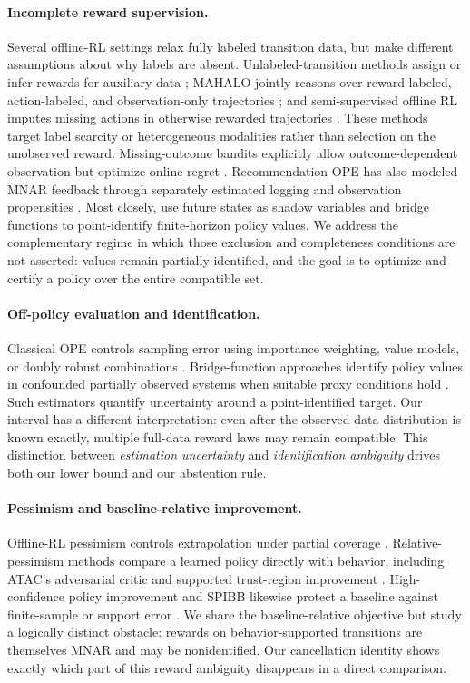 \documentclass[letterpaper]{article}
\theoremstyle{remark}
\begin{document}
\paragraph{Incomplete reward supervision.}
Several offline-RL settings relax fully labeled transition data, but make different assumptions about why labels are absent. Unlabeled-transition methods assign or infer rewards for auxiliary data \citep{yu2022unlabeled}; MAHALO jointly reasons over reward-labeled, action-labeled, and observation-only trajectories \citep{li2023mahalo}; and semi-supervised offline RL imputes missing actions in otherwise rewarded trajectories \citep{zheng2023semi}. These methods target label scarcity or heterogeneous modalities rather than selection on the unobserved reward. Missing-outcome bandits explicitly allow outcome-dependent observation but optimize online regret \citep{mahrooghi2025missing}. Recommendation OPE has also modeled MNAR feedback through separately estimated logging and observation propensities \citep{takahashi2025mnar}. Most closely, \citet{wei2026mnar} use future states as shadow variables and bridge functions to point-identify finite-horizon policy values. We address the complementary regime in which those exclusion and completeness conditions are not asserted: values remain partially identified, and the goal is to optimize and certify a policy over the entire compatible set.

\paragraph{Off-policy evaluation and identification.}
Classical OPE controls sampling error using importance weighting, value models, or doubly robust combinations \citep{jiang2016doubly}. Bridge-function approaches identify policy values in confounded partially observed systems when suitable proxy conditions hold \citep{shi2022confounded}. Such estimators quantify uncertainty around a point-identified target. Our interval has a different interpretation: even after the observed-data distribution is known exactly, multiple full-data reward laws may remain compatible. This distinction between \emph{estimation uncertainty} and \emph{identification ambiguity} drives both our lower bound and our abstention rule.

\paragraph{Pessimism and baseline-relative improvement.}
Offline-RL pessimism controls extrapolation under partial coverage \citep{uehara2022pessimistic}. Relative-pessimism methods compare a learned policy directly with behavior, including ATAC's adversarial critic \citep{cheng2022atac} and supported trust-region improvement \citep{mao2023supported}. High-confidence policy improvement and SPIBB likewise protect a baseline against finite-sample or support error \citep{thomas2015high,laroche2019spibb}. We share the baseline-relative objective but study a logically distinct obstacle: rewards on behavior-supported transitions are themselves MNAR and may be nonidentified. Our cancellation identity shows exactly which part of this reward ambiguity disappears in a direct comparison.
\end{document}
